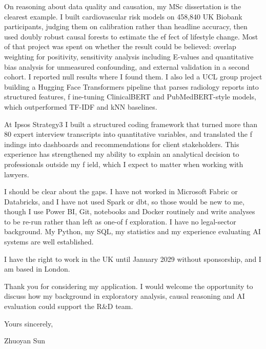 \documentclass[letterpaper,11pt]{article}
\begin{document}
On reasoning about data quality and causation, my MSc dissertation is the clearest example. I built cardiovascular risk models on 458,840 UK Biobank participants, judging them on calibration rather than headline accuracy, then used doubly robust causal forests to estimate the ef\kern0pt fect of lifestyle change. Most of that project was spent on whether the result could be believed: overlap weighting for positivity, sensitivity analysis including E-values and quantitative bias analysis for unmeasured confounding, and external validation in a second cohort. I reported null results where I found them. I also led a UCL group project building a Hugging Face Transformers pipeline that parses radiology reports into structured features, f\kern0pt ine-tuning ClinicalBERT and PubMedBERT-style models, which outperformed TF-IDF and kNN baselines.

At Ipsos Strategy3 I built a structured coding framework that turned more than 80 expert interview transcripts into quantitative variables, and translated the f\kern0pt indings into dashboards and recommendations for client stakeholders. This experience has strengthened my ability to explain an analytical decision to professionals outside my f\kern0pt ield, which I expect to matter when working with lawyers.

I should be clear about the gaps. I have not worked in Microsoft Fabric or Databricks, and I have not used Spark or dbt, so those would be new to me, though I use Power BI, Git, notebooks and Docker routinely and write analyses to be re-run rather than left as one-of\kern0pt f exploration. I have no legal-sector background. My Python, my SQL, my statistics and my experience evaluating AI systems are well established.

I have the right to work in the UK until January 2029 without sponsorship, and I am based in London.

Thank you for considering my application. I would welcome the opportunity to discuss how my background in exploratory analysis, causal reasoning and AI evaluation could support the R\&D team.

\vspace{2pt}
Yours sincerely,

\vspace{8pt}
Zhuoyan Sun
\end{document}
